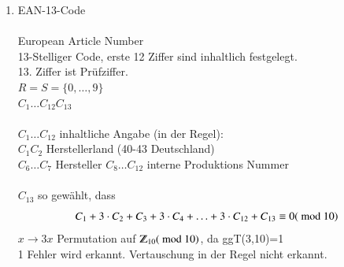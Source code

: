 \begin{enumerate}
\item EAN-13-Code\\
\\
European Article Number\\
13-Stelliger Code, erste 12 Ziffer sind inhaltlich festgelegt.\\
13. Ziffer ist Pr\"ufziffer.\\
$R=S=\{ 0, \ldots, 9\}$ \\
$C_1 \ldots C_{12}C_{13}$\\
\\
$C_1 \ldots C_{12}$ inhaltliche Angabe (in der Regel):\\
$C_1C_2$ Herstellerland (40-43 Deutschland)\\
$C_6 \ldots C_7$ Hersteller
$C_8 \ldots C_12$ interne Produktions Nummer\\
\\
$C_{13}$ so gew\"ahlt, dass\\
\[
	C_1 + 3\cdot C_2 + C_3 + 3\cdot C_4 + \ldots + 3\cdot C_{12} + C_{13} \equiv 0 (\textrm{ mod } 10)
\]
$x \rightarrow 3x$ Permutation auf $\Z_{10} (\md 10)$, da ggT(3,10)=1\\ %
1 Fehler wird erkannt. Vertauschung in der Regel nicht erkannt.
\end{enumerate}